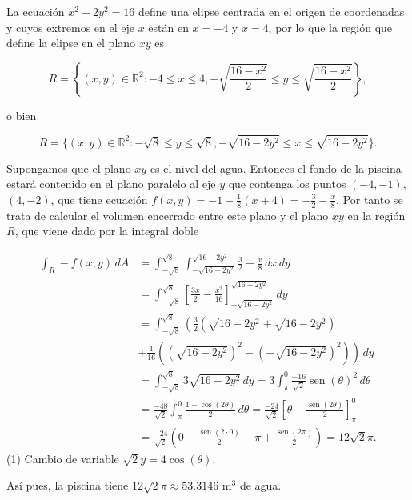 \documentclass[
  spanish,
  a4paper,
]{scrreport}
\theoremstyle{definition}
\theoremstyle{remark}
\begin{document}
\begin{tcolorbox}[enhanced jigsaw, arc=.35mm, bottomrule=.15mm, bottomtitle=1mm, breakable, colback=white, colbacktitle=quarto-callout-tip-color!10!white, colframe=quarto-callout-tip-color-frame, coltitle=black, left=2mm, leftrule=.75mm, opacityback=0, opacitybacktitle=0.6, rightrule=.15mm, title=\textcolor{quarto-callout-tip-color}{\faLightbulb}\hspace{0.5em}{Solución}, titlerule=0mm, toprule=.15mm, toptitle=1mm]

La ecuación \(x^2+2y^2=16\) define una elipse centrada en el origen de
coordenadas y cuyos extremos en el eje \(x\) están en \(x=-4\) y
\(x=4\), por lo que la región que define la elipse en el plano \(xy\) es

\[
R = \left\{(x,y)\in\mathbb{R}^2: -4\leq x\leq 4, -\sqrt{\frac{16-x^2}{2}}\leq y\leq \sqrt{\frac{16-x^2}{2}}\right\},
\]

o bien

\[
R = \{(x,y)\in\mathbb{R}^2: -\sqrt{8}\leq y\leq \sqrt{8}, -\sqrt{16-2y^2}\leq x\leq \sqrt{16-2y^2}\}.
\]

Supongamos que el plano \(xy\) es el nivel del agua. Entonces el fondo
de la piscina estará contenido en el plano paralelo al eje \(y\) que
contenga los puntos \((-4,-1)\), \((4,-2)\), que tiene ecuación
\(f(x,y) = -1-\frac{1}{8}(x+4) = -\frac{3}{2}-\frac{x}{8}\). Por tanto
se trata de calcular el volumen encerrado entre este plano y el plano
\(xy\) en la región \(R\), que viene dado por la integral doble

\begin{align*}
\int_R -f(x,y)\,dA
&= \int_{-\sqrt{8}}^{\sqrt{8}} \int_{-\sqrt{16-2y^2}}^{\sqrt{16-2y^2}} \frac{3}{2}+\frac{x}{8}\,dx\,dy \\
&= \int_{-\sqrt{8}}^{\sqrt{8}} \left[\frac{3x}{2}-\frac{x^2}{16}\right]_{-\sqrt{16-2y^2}}^{\sqrt{16-2y^2}}\,dy \\
&= \int_{-\sqrt{8}}^{\sqrt{8}} \left(\frac{3}{2}(\sqrt{16-2y^2}+ \sqrt{16-2y^2})\right. \\
&+ \left.\frac{1}{16}((\sqrt{16-2y^2})^2-(-\sqrt{16-2y^2})^2)\right)\,dy \\
&= \int_{-\sqrt{8}}^{\sqrt{8}} 3\sqrt{16-2y^2} \,dy 
= 3\int_{\pi}^0 \frac{-16}{\sqrt{2}}\operatorname{sen}(\theta)^2\,d\theta \tag{1} \\
&= \frac{-48}{\sqrt{2}}\int_{\pi}^0 \frac{1-\cos(2\theta)}{2}\,d\theta 
= \frac{-24}{\sqrt{2}} \left[\theta-\frac{\operatorname{sen}(2\theta)}{2}\right]_{\pi}^0 \\
&= \frac{-24}{\sqrt{2}} \left(0-\frac{\operatorname{sen}(2\cdot 0)}{2}-\pi+\frac{\operatorname{sen}(2\pi)}{2}\right)
= 12\sqrt{2}\pi.
\end{align*} (1) Cambio de variable \(\sqrt{2}y=4\cos(\theta)\).

Así pues, la piscina tiene \(12\sqrt{2}\pi\approx 53.3146\) m\(^3\) de
agua.

\end{tcolorbox}
\end{document}
